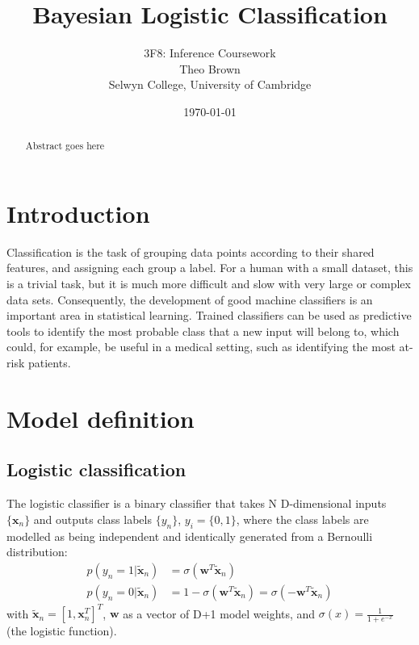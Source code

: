 \documentclass[a4paper]{article}
\begin{document}
    \title{Bayesian Logistic Classification}
    \author{3F8: Inference Coursework \\ Theo Brown \\ Selwyn College, University of Cambridge}
    \date{\today}
    \maketitle

    \begin{abstract}
        Abstract goes here
    \end{abstract}
    
    \section{Introduction}\label{sec:introduction}
  Classification is the task of grouping data points according to their shared features, and assigning each group a label.
  For a human with a small dataset, this is a trivial task, but it is much more difficult and slow with very large or complex data sets.
  Consequently, the development of good machine classifiers is an important area in statistical learning.
  Trained classifiers can be used as predictive tools to identify the most probable class that a new input will belong to, which could, for example, be useful in a medical setting, such as identifying the most at-risk patients.

    \section{Model definition}\label{sec:model-definition}
    \subsection{Logistic classification}
    The logistic classifier is a binary classifier that takes N D-dimensional inputs $\{\bm{x}_n\}$ and outputs class labels $\{y_n\}$, $y_i = \{0, 1\}$, where the class labels are modelled as being independent and identically generated from a Bernoulli distribution:
    \begin{align}
        p(y_n = 1 | \tilde{\bm{x}}_n) &= \sigma (\bm{w}^T\tilde{\bm{x}}_n) \nonumber \\
        p(y_n = 0 | \tilde{\bm{x}}_n) &= 1 - \sigma (\bm{w}^T\tilde{\bm{x}}_n) = \sigma (-\bm{w}^T\tilde{\bm{x}}_n)
        \label{eq:logistic-classifier}
    \end{align}
    with $\tilde{\bm{x}}_n = \left[1, \bm{x}_n^T \right]^T$, $\bm{w}$ as a vector of D+1 model weights, and $\sigma(x) = \frac{1}{1 + e^{-x}}$ (the logistic function).
\end{document}

